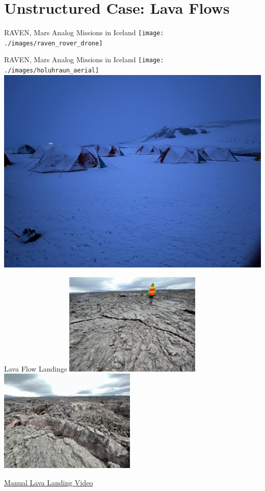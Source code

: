\documentclass[aspectratio=169]{beamer}
\begin{document}
\section{Unstructured Case: Lava Flows}

\begin{frame}{RAVEN, Mars Analog Missions in Iceland}
	\centering
	\texttt{[image: ./images/raven\_rover\_drone]}

	{\tiny{}}
\end{frame}

\begin{frame}{RAVEN, Mars Analog Missions in Iceland}
	\centering
	\texttt{[image: ./images/holuhraun\_aerial]}
	\includegraphics[height=0.55\textheight]{./images/dreki_small_tents_snow}
\end{frame}

\begin{frame}{Lava Flow Landings}
	\centering
	\includegraphics[width=0.49\textwidth]{./images/holuhraun_smooth}
	\includegraphics[width=0.49\textwidth]{./images/holuhraun_rough}

	\href{run:./lava_landing.mp4}{Manual Lava Landing Video}
\end{frame}
\end{document}
